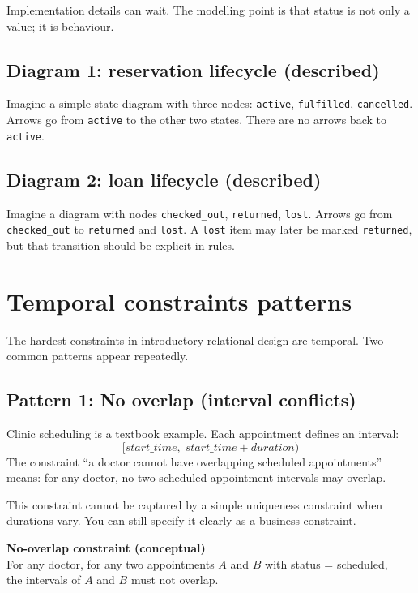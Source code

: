 Implementation details can wait.
The modelling point is that status is not only a value; it is behaviour.

\subsection{Diagram 1: reservation lifecycle (described)}
Imagine a simple state diagram with three nodes: \texttt{active}, \texttt{fulfilled}, \texttt{cancelled}.
Arrows go from \texttt{active} to the other two states.
There are no arrows back to \texttt{active}.

\subsection{Diagram 2: loan lifecycle (described)}
Imagine a diagram with nodes \texttt{checked\_out}, \texttt{returned}, \texttt{lost}.
Arrows go from \texttt{checked\_out} to \texttt{returned} and \texttt{lost}.
A \texttt{lost} item may later be marked \texttt{returned}, but that transition should be explicit in rules.

\section{Temporal constraints patterns}
The hardest constraints in introductory relational design are temporal.
Two common patterns appear repeatedly.

\subsection{Pattern 1: No overlap (interval conflicts)}
Clinic scheduling is a textbook example.
Each appointment defines an interval:
\[
[start\_time,\; start\_time + duration)
\]
The constraint “a doctor cannot have overlapping scheduled appointments” means:
for any doctor, no two scheduled appointment intervals may overlap.

This constraint cannot be captured by a simple uniqueness constraint when durations vary.
You can still specify it clearly as a business constraint.

\begin{examplebox}
\textbf{No-overlap constraint (conceptual)}\\
For any doctor, for any two appointments \(A\) and \(B\) with status = scheduled,\\
the intervals of \(A\) and \(B\) must not overlap.
\end{examplebox}

